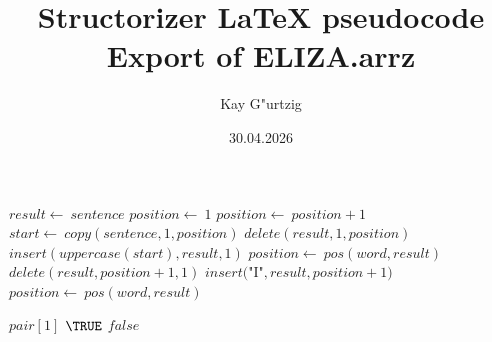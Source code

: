 \documentclass[a4paper,10pt]{article}
\title{Structorizer LaTeX pseudocode Export of ELIZA.arrz}
\author{Kay G"urtzig}
\date{30.04.2026}
\begin{document}
\begin{algorithm}
\caption{adjustSpelling(sentence)}
\begin{algorithmic}[5]

\STATE {}
  \STATE \(result\gets\ sentence\)
  \STATE \(position\gets\ 1\)
    \STATE \(position\gets\ position+1\)
  \ENDWHILE
    \STATE \(start\gets\ copy(sentence,1,position)\)
    \STATE \(delete(result,1,position)\)
    \STATE \(insert(uppercase(start),result,1)\)
  \ENDIF
    \STATE \(position\gets\ pos(word,result)\)
      \STATE \(delete(result,position+1,1)\)
      \STATE \(insert(\)"{}I"{}\(,result,position+1)\)
      \STATE \(position\gets\ pos(word,result)\)
    \ENDWHILE
  \ENDFOR

\end{algorithmic}
\end{algorithm}


\begin{algorithm}
\caption{checkGoodBye(text, phrases)}
\begin{algorithmic}[5]

\STATE {}
\STATE {}
\STATE {}
\STATE {}
      \PRINT\(pair[1]\)
      \RETURN\(\TRUE\)
    \ENDIF
  \ENDFOR
  \RETURN\(false\)

\end{algorithmic}
\end{algorithm}
\end{document}
